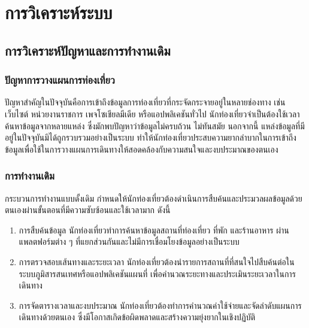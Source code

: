 
\section{การวิเคราะห์ระบบ}

\subsection{การวิเคราะห์ปัญหาและการทำงานเดิม}

\subsubsection{ปัญหาการวางแผนการท่องเที่ยว}

ปัญหาสำคัญในปัจจุบันคือการเข้าถึงข้อมูลการท่องเที่ยวที่กระจัดกระจายอยู่ในหลายช่องทาง เช่น เว็บไซต์ หน่วยงานราชการ เพจโซเชียลมีเดีย หรือแอปพลิเคชันทั่วไป นักท่องเที่ยวจำเป็นต้องใช้เวลาค้นหาข้อมูลจากหลายแหล่ง ซึ่งมักพบปัญหาว่าข้อมูลไม่ครบถ้วน ไม่ทันสมัย นอกจากนี้ แหล่งข้อมูลที่มีอยู่ในปัจจุบันมิได้ถูกรวบรวมอย่างเป็นระบบ ทำให้นักท่องเที่ยวประสบความยากลำบากในการเข้าถึงข้อมูลเพื่อใช้ในการวางแผนการเดินทางให้สอดคล้องกับความสนใจและงบประมาณของตนเอง

\subsubsection{การทำงานเดิม}

กระบวนการทำงานแบบดั้งเดิม กำหนดให้นักท่องเที่ยวต้องดำเนินการสืบค้นและประมวลผลข้อมูลด้วยตนเองผ่านขั้นตอนที่มีความซับซ้อนและใช้เวลามาก ดังนี้

\begin{enumerate}
\item การสืบค้นข้อมูล นักท่องเที่ยวทำการค้นหาข้อมูลสถานที่ท่องเที่ยว ที่พัก และร้านอาหาร ผ่านแพลตฟอร์มต่าง ๆ ที่แยกส่วนกันและไม่มีการเชื่อมโยงข้อมูลอย่างเป็นระบบ
\item การตรวจสอบเส้นทางและระยะเวลา นักท่องเที่ยวต้องนำรายการสถานที่ที่สนใจไปสืบค้นต่อในระบบภูมิสารสนเทศหรือแอปพลิเคชันแผนที่ เพื่อคำนวณระยะทางและประเมินระยะเวลาในการเดินทาง
\item การจัดตารางเวลาและงบประมาณ นักท่องเที่ยวต้องทำการคำนวณค่าใช้จ่ายและจัดลำดับแผนการเดินทางด้วยตนเอง ซึ่งมีโอกาสเกิดข้อผิดพลาดและสร้างความยุ่งยากในเชิงปฏิบัติ
\end{enumerate}


